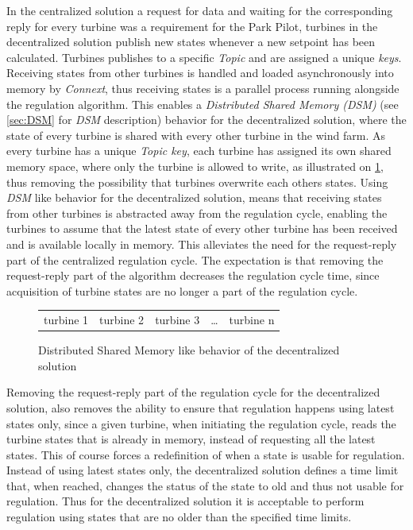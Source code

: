 In the centralized solution a request for data and waiting for the corresponding reply for every turbine was a requirement for the Park Pilot, turbines in the decentralized solution publish new states whenever a new setpoint has been calculated. Turbines publishes to a specific \textit{Topic} and are assigned a unique \textit{keys}. Receiving states from other turbines is handled and loaded asynchronously into memory by \textit{Connext}, thus receiving states is a parallel process running alongside the regulation algorithm.
This enables a \textit{Distributed Shared Memory (DSM)} (see \cref{sec:DSM} for \textit{DSM} description) behavior for the decentralized solution, where the state of every turbine is shared with every other turbine in the wind farm.
As every turbine has a unique \textit{Topic key}, each turbine has assigned its own shared memory space, where only the turbine is allowed to write, as illustrated on \cref{fig:DSMlikeBehavior}, thus removing the possibility that turbines overwrite each others states. Using \textit{DSM} like behavior for the decentralized solution, means that receiving states from other turbines is abstracted away from the regulation cycle, enabling the turbines to assume that the latest state of every other turbine has been received and is available locally in memory. This alleviates the need for the request-reply part of the centralized regulation cycle. The expectation is that removing the request-reply part of the algorithm decreases the regulation cycle time, since acquisition of turbine states are no longer a part of the regulation cycle.  

\begin{figure}[!h]
	\begin{tabular}{ | c | c | c | c | c |}
		\cline{1-3}
		\cline{5-5}
		turbine 1 & turbine 2 & turbine 3 & \dots & turbine n \\
		\cline{1-3}
		\cline{5-5}
	\end{tabular}
	\caption{Distributed Shared Memory like behavior of the decentralized solution}
	\label{fig:DSMlikeBehavior}
\end{figure}

Removing the request-reply part of the regulation cycle for the decentralized solution, also removes the ability to ensure that regulation happens using latest states only, since a given turbine, when initiating the regulation cycle, reads the turbine states that is already in memory, instead of requesting all the latest states. This of course forces a redefinition of when a state is usable for regulation. Instead of using latest states only, the decentralized solution defines a time limit that, when reached, changes the status of the state to old and thus not usable for regulation. Thus for the decentralized solution it is acceptable to perform regulation using states that are no older than the specified time limits. 


